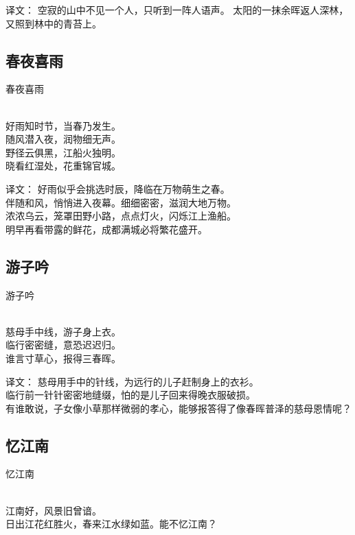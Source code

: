 译文：
空寂的山中不见一个人，只听到一阵人语声。
太阳的一抹余晖返人深林，又照到林中的青苔上。

\subsection{春夜喜雨}

\noindent 春夜喜雨

  \\

\noindent 好雨知时节，当春乃发生。\\
随风潜入夜，润物细无声。\\
野径云俱黑，江船火独明。\\
晓看红湿处，花重锦官城。

译文：
好雨似乎会挑选时辰，降临在万物萌生之春。\\
伴随和风，悄悄进入夜幕。细细密密，滋润大地万物。\\
浓浓乌云，笼罩田野小路，点点灯火，闪烁江上渔船。\\
明早再看带露的鲜花，成都满城必将繁花盛开。

\subsection{游子吟}

\noindent 游子吟

  \\

\noindent 慈母手中线，游子身上衣。\\
临行密密缝，意恐迟迟归。\\
谁言寸草心，报得三春晖。

译文：
慈母用手中的针线，为远行的儿子赶制身上的衣衫。\\
临行前一针针密密地缝缀，怕的是儿子回来得晚衣服破损。\\
有谁敢说，子女像小草那样微弱的孝心，能够报答得了像春晖普泽的慈母恩情呢？

\subsection{忆江南}

\noindent 忆江南

  \\

\noindent 江南好，风景旧曾谙。\\
日出江花红胜火，春来江水绿如蓝。能不忆江南？

